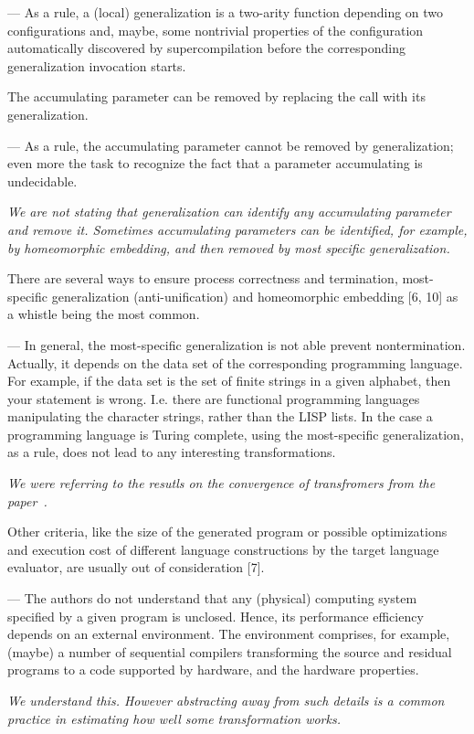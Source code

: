 \begin{enumerate}
{{      --- As a rule, a (local) generalization is a two-arity function depending on two configurations and, maybe, some nontrivial properties of the configuration automatically discovered by supercompilation before the corresponding generalization invocation starts.

    }

    \item{
      The accumulating parameter can be removed by replacing the call with its generalization.

      --- As a rule, the accumulating parameter cannot be removed by generalization; even more the task to recognize the fact that a parameter accumulating is undecidable.

      \emph{We are not stating that generalization can identify any accumulating parameter and remove it. Sometimes accumulating parameters can be identified, for example, by homeomorphic embedding, and then removed by most specific generalization.}
    }

    \item{
      There are several ways to ensure process correctness and termination, most-specific generalization (anti-unification) and homeomorphic embedding [6, 10] as a whistle being the most common.

      --- In general, the most-specific generalization is not able prevent nontermination. Actually, it depends on the data set of the corresponding programming language. For example, if the data set is the set of finite strings in a given alphabet, then your statement is wrong. I.e. there are functional programming languages manipulating the character strings, rather than the LISP lists. In the case a programming language is Turing complete, using the most-specific generalization, as a rule, does not lead to any interesting transformations.

      \emph{We were referring to the resutls on the convergence of transfromers from the paper~\cite{sorensen1998convergence}.}
    }

    \item{Other criteria, like the size of the generated program or possible optimizations and execution cost of different language constructions by the target language evaluator, are usually out of consideration [7].

    --- The authors do not understand that any (physical) computing system specified by a given program is unclosed. Hence, its performance efficiency depends on an external environment. The environment comprises, for example, (maybe) a number of sequential compilers transforming the source and residual programs to a code supported by hardware, and the hardware properties.

    \emph{We understand this. However abstracting away from such details is a common practice in estimating how well some transformation works.}
    }

  }
\end{enumerate}

